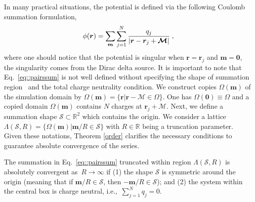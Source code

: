 In many practical situations, the potential is defined via the following Coulomb summation formulation,
\begin{equation}\label{eq::pairssum}
	\phi(\bm{r})=\sum_{\boldsymbol{m}}\sum_{j=1}^{N}\frac{q_{j}}{|\bm{r}-\bm{r}_{j} + \bm{\mathcal{M}}|}\;,
\end{equation}
where one should notice that the potential is singular when $\bm{r}=\bm{r}_{j}$ and $\bm{m}=\bm{0}$, the singularity comes from the Dirac delta source. 
It is important to note that Eq.~\eqref{eq::pairssum} is not well defined without specifying the shape of summation region~\cite{de1980simulation,smith2008electrostatic} and the total charge neutrality condition. 
We construct copies $\Omega(\bm{m})$ of the simulation domain by $\Omega(\bm{m})=\{\bm{r}|\bm{r}-\bm{\mathcal{M}}\in\Omega\}$. One has $\Omega(\bm{0})\equiv\Omega$ and a copied domain $\Omega(\bm{m})$ contains $N$ charges at $\bm{r}_j+\bm{\mathcal{M}}$. 
Next, we define a summation shape $\mathcal{S} \subset \mathbb{R}^2$ which contains the origin.
We consider a lattice $\Lambda(\mathcal{S},R)=\{\Omega(\bm{m})|\bm{m}/R\in\mathcal{S}\}$ with $R\in\mathbb{R}$ being a truncation parameter. 
Given these notations, Theorem \ref{order} clarifies the necessary conditions to guarantee absolute convergence of the series.

\begin{thm} \label{order}
    The summation in Eq.~\eqref{eq::pairssum} truncated within region $\Lambda(\mathcal{S},R)$ is absolutely convergent as~$R \to \infty$ if (1) the shape $\mathcal{S}$ is symmetric around the origin (meaning that if $\bm{m} / R \in \mathcal{S}$, then $- \bm{m}/ R \in \mathcal{S}$); and (2) the system within the central box is charge neutral, i.e.,~$\sum_{j = 1}^N q_j = 0$.
\end{thm}

